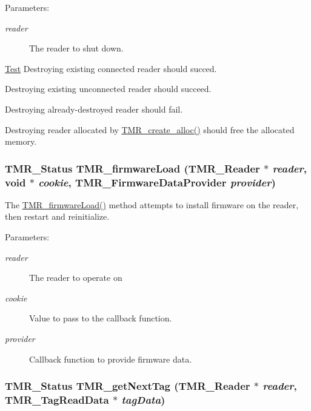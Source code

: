 \begin{Desc}
\item[Parameters:]
\begin{description}
\item[{\em reader}]The reader to shut down.\end{description}
\end{Desc}
\begin{Desc}
\item[\hyperlink{test__test000004}{Test}]Destroying existing connected reader should succed. 

Destroying existing unconnected reader should succeed. 

Destroying already-destroyed reader should fail. 

Destroying reader allocated by \hyperlink{group__reader_g3a75a6998463bfdf20242a3fb9c82427}{TMR\_\-create\_\-alloc()} should free the allocated memory. \end{Desc}
\hypertarget{group__reader_g865559def5875922baf2c921e8af822b}{
\subsubsection[{TMR\_\-firmwareLoad}]{\setlength{\rightskip}{0pt plus 5cm}TMR\_\-Status TMR\_\-firmwareLoad ({\bf TMR\_\-Reader} $\ast$ {\em reader}, \/  void $\ast$ {\em cookie}, \/  {\bf TMR\_\-FirmwareDataProvider} {\em provider})}}
\label{group__reader_g865559def5875922baf2c921e8af822b}


The \hyperlink{group__reader_g865559def5875922baf2c921e8af822b}{TMR\_\-firmwareLoad()} method attempts to install firmware on the reader, then restart and reinitialize.

\begin{Desc}
\item[Parameters:]
\begin{description}
\item[{\em reader}]The reader to operate on \item[{\em cookie}]Value to pass to the callback function. \item[{\em provider}]Callback function to provide firmware data. \end{description}
\end{Desc}
\hypertarget{group__reader_gbee8bf69ae6010858c5425956308292b}{
\subsubsection[{TMR\_\-getNextTag}]{\setlength{\rightskip}{0pt plus 5cm}TMR\_\-Status TMR\_\-getNextTag ({\bf TMR\_\-Reader} $\ast$ {\em reader}, \/  {\bf TMR\_\-TagReadData} $\ast$ {\em tagData})}}
\label{group__reader_gbee8bf69ae6010858c5425956308292b}


